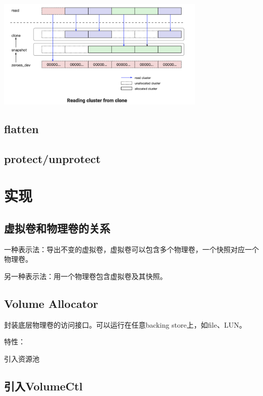 \begin{center}
\includegraphics[width=10cm]{../imgs/clone-read.png}
\end{center}

\subsection{flatten}

\subsection{protect/unprotect}

\section{实现}

\subsection{虚拟卷和物理卷的关系}

一种表示法：导出不变的虚拟卷，虚拟卷可以包含多个物理卷，一个快照对应一个物理卷。

另一种表示法：用一个物理卷包含虚拟卷及其快照。

\subsection{Volume Allocator}

封装底层物理卷的访问接口。可以运行在任意backing store上，如file、LUN。

特性：
\begin{enumbox}
\item 引入资源池
\end{enumbox}

\subsection{引入VolumeCtl}


